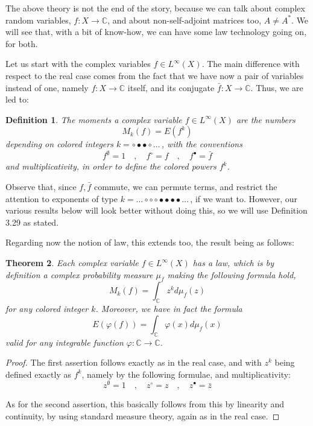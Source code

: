 \documentclass[12pt]{amsbook}
\newtheorem{theorem}{Theorem}[chapter]
\newtheorem{definition}[theorem]{Definition}
\begin{document}
The above theory is not the end of the story, because we can talk about complex random variables, $f:X\to\mathbb C$, and about non-self-adjoint matrices too, $A\neq A^*$. We will see that, with a bit of know-how, we can have some law technology going on, for both.

\bigskip

Let us start with the complex variables $f\in L^\infty(X)$. The main difference with respect to the real case comes from the fact that we have now a pair of variables instead of one, namely $f:X\to\mathbb C$ itself, and its conjugate $\bar{f}:X\to\mathbb C$. Thus, we are led to:


\begin{definition}
The moments a complex variable $f\in L^\infty(X)$ are the numbers
$$M_k(f)=E(f^k)$$
depending on colored integers $k=\circ\bullet\bullet\circ\ldots\,$, with the conventions
$$f^\emptyset=1\quad,\quad f^\circ=f\quad,\quad f^\bullet=\bar{f}$$
and multiplicativity, in order to define the colored powers $f^k$.
\end{definition}

Observe that, since $f,\bar{f}$ commute, we can permute terms, and restrict the attention to exponents of type $k=\ldots\circ\circ\circ\bullet\bullet\bullet\bullet\ldots\,$, if we want to. However, our various results below will look better without doing this, so we will use Definition 3.29 as stated.

\bigskip

Regarding now the notion of law, this extends too, the result being as follows:

\begin{theorem}
Each complex variable $f\in L^\infty(X)$ has a law, which is by definition a complex probability measure $\mu_f$ making the following formula hold,
$$M_k(f)=\int_\mathbb Cz^kd\mu_f(z)$$
for any colored integer $k$. Moreover, we have in fact the formula
$$E(\varphi(f))=\int_\mathbb C\varphi(x)d\mu_f(x)$$
valid for any integrable function $\varphi:\mathbb C\to\mathbb C$.
\end{theorem}

\begin{proof}
The first assertion follows exactly as in the real case, and with $z^k$ being defined exactly as $f^k$, namely by the following formulae, and multiplicativity: 
$$z^\emptyset=1\quad,\quad z^\circ=z\quad,\quad z^\bullet=\bar{z}$$

As for the second assertion, this basically follows from this by linearity and continuity, by using standard measure theory, again as in the real case.
\end{proof}
\end{document}
